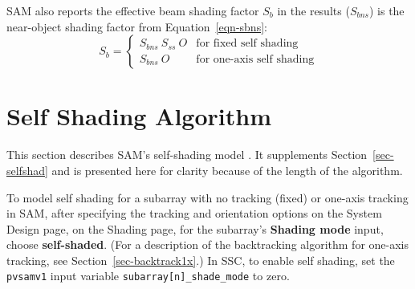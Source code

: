 \documentclass[12pt,letterpaper]{article}
\begin{document}
SAM also reports the effective beam shading factor $S_b$ in the results ($S_{bns}$) is the near-object shading factor from Equation~\ref{eqn-sbns}:
\begin{equation}
S_b = \left\{
\begin{array}{ll}
S_{bns}~S_{ss}~O &\text{for fixed self shading}\\
S_{bns}~O &\text{for one-axis self shading} 
\end{array}
\right.
\end{equation}

\chapter{Self Shading Algorithm}\label{sec-selfshadalg}

This section describes SAM's self-shading model \citep{deline2013a}. It supplements Section~\ref{sec-selfshad} and is presented here for clarity because of the length of the algorithm.

To model self shading for a subarray with no tracking (fixed) or one-axis tracking in SAM, after specifying the tracking and orientation options on the System Design page, on the Shading page, for the subarray's \textbf{Shading mode} input, choose \textbf{self-shaded}. (For a description of the backtracking algorithm for one-axis tracking, see Section~\ref{sec-backtrack1x}.) In SSC, to enable self shading, set the \texttt{pvsamv1} input variable \texttt{subarray[n]\_shade\_mode} to zero.
\end{document}
